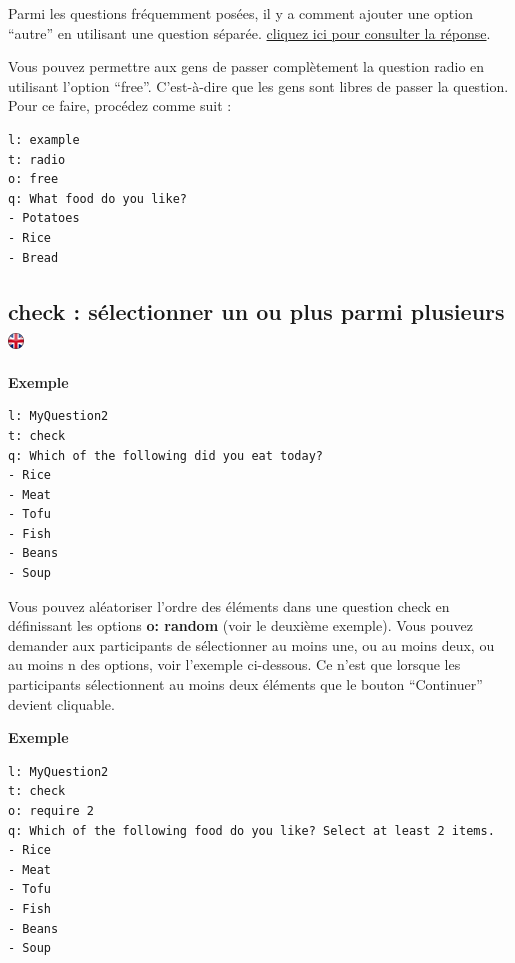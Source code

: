 \documentclass[
]{book}
\begin{document}
Parmi les questions fréquemment posées, il y a comment ajouter une option ``autre'' en utilisant une question séparée. \href{https://www.psytoolkit.org/doc3.4.0/online-survey-syntax.html\#other}{cliquez ici pour consulter la réponse}.

Vous pouvez permettre aux gens de passer complètement la question radio en utilisant l'option ``free''. C'est-à-dire que les gens sont libres de passer la question. Pour ce faire, procédez comme suit :

\begin{verbatim}
l: example
t: radio
o: free
q: What food do you like?
- Potatoes
- Rice
- Bread
\end{verbatim}

\hypertarget{check-suxe9lectionner-un-ou-plus-parmi-plusieurs}{%
\subsection[check : sélectionner un ou plus parmi plusieurs ]{\texorpdfstring{check : sélectionner un ou plus parmi plusieurs \href{https://www.psytoolkit.org/doc3.4.0/online-survey-syntax.html\#check}{\protect\includegraphics{img/ukflag.png}}}{check : sélectionner un ou plus parmi plusieurs }}\label{check-suxe9lectionner-un-ou-plus-parmi-plusieurs}}

\textbf{Exemple}

\begin{verbatim}
l: MyQuestion2
t: check
q: Which of the following did you eat today?
- Rice
- Meat
- Tofu
- Fish
- Beans
- Soup
\end{verbatim}

Vous pouvez aléatoriser l'ordre des éléments dans une question check en définissant les options \textbf{o: random} (voir le deuxième exemple). Vous pouvez demander aux participants de sélectionner au moins une, ou au moins deux, ou au moins n des options, voir l'exemple ci-dessous. Ce n'est que lorsque les participants sélectionnent au moins deux éléments que le bouton ``Continuer'' devient cliquable.

\textbf{Exemple}

\begin{verbatim}
l: MyQuestion2
t: check
o: require 2
q: Which of the following food do you like? Select at least 2 items.
- Rice
- Meat
- Tofu
- Fish
- Beans
- Soup
\end{verbatim}
\end{document}
